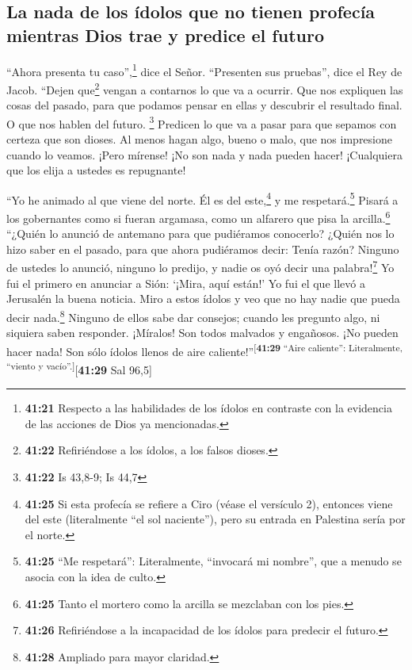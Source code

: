 \hypertarget{la-nada-de-los-uxeddolos-que-no-tienen-profecuxeda-mientras-dios-trae-y-predice-el-futuro}{%
\subsection{La nada de los ídolos que no tienen profecía mientras Dios
trae y predice el
futuro}\label{la-nada-de-los-uxeddolos-que-no-tienen-profecuxeda-mientras-dios-trae-y-predice-el-futuro}}

 ``Ahora presenta tu caso'',\footnote{\textbf{41:21}
  Respecto a las habilidades de los ídolos en contraste con la evidencia
  de las acciones de Dios ya mencionadas.} dice el Señor. ``Presenten
sus pruebas'', dice el Rey de Jacob.  ``Dejen
que\footnote{\textbf{41:22} Refiriéndose a los ídolos, a los falsos
  dioses.} vengan a contarnos lo que va a ocurrir. Que nos expliquen las
cosas del pasado, para que podamos pensar en ellas y descubrir el
resultado final. O que nos hablen del futuro. \footnote{\textbf{41:22}
  Is 43,8-9; Is 44,7}  Predicen lo que va a pasar para
que sepamos con certeza que son dioses. Al menos hagan algo, bueno o
malo, que nos impresione cuando lo veamos.  ¡Pero
mírense! ¡No son nada y nada pueden hacer! ¡Cualquiera que los elija a
ustedes es repugnante!

 ``Yo he animado al que viene del norte. Él es del
este,\footnote{\textbf{41:25} Si esta profecía se refiere a Ciro (véase
  el versículo 2), entonces viene del este (literalmente ``el sol
  naciente''), pero su entrada en Palestina sería por el norte.} y me
respetará.\footnote{\textbf{41:25} ``Me respetará'': Literalmente,
  ``invocará mi nombre'', que a menudo se asocia con la idea de culto.}
Pisará a los gobernantes como si fueran argamasa, como un alfarero que
pisa la arcilla.\footnote{\textbf{41:25} Tanto el mortero como la
  arcilla se mezclaban con los pies.}  ``¿Quién lo
anunció de antemano para que pudiéramos conocerlo? ¿Quién nos lo hizo
saber en el pasado, para que ahora pudiéramos decir: Tenía razón?
Ninguno de ustedes lo anunció, ninguno lo predijo, y nadie os oyó decir
una palabra!\footnote{\textbf{41:26} Refiriéndose a la incapacidad de
  los ídolos para predecir el futuro.}  Yo fui el primero
en anunciar a Sión: `¡Mira, aquí están!' Yo fui el que llevó a Jerusalén
la buena noticia.  Miro a estos ídolos y veo que no hay
nadie que pueda decir nada.\footnote{\textbf{41:28} Ampliado para mayor
  claridad.} Ninguno de ellos sabe dar consejos; cuando les pregunto
algo, ni siquiera saben responder.  ¡Míralos! Son todos
malvados y engañosos. ¡No pueden hacer nada! Son sólo ídolos llenos de
aire caliente!''\textsuperscript{{[}\textbf{41:29} ``Aire caliente'':
Literalmente, ``viento y vacío''.{]}}{[}\textbf{41:29} Sal 96,5{]}

